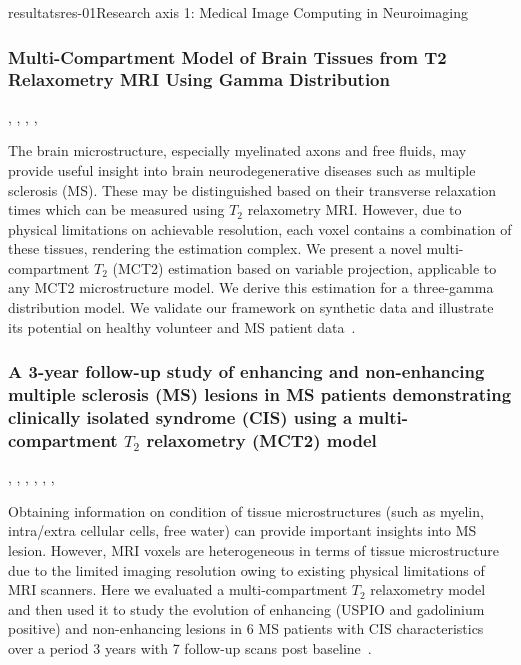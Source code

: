 \documentclass{ra2018}
\begin{document}
\begin{module}{resultats}{res-01}{Research axis 1: Medical Image Computing in Neuroimaging}
\subsubsection{Multi-Compartment Model of Brain Tissues from T2 Relaxometry MRI Using Gamma Distribution}
\begin{participants}
      , 
      ,
      ,
      ,
\end{participants}
The brain microstructure, especially myelinated axons and free fluids, may provide useful insight into brain neurodegenerative diseases such as multiple sclerosis (MS). These may be distinguished based on their transverse relaxation times which can be measured using $T_2$ relaxometry MRI. However, due to physical limitations on achievable resolution, each voxel contains a combination of these tissues, rendering the estimation complex. We present a novel multi-compartment $T_2$ (MCT2) estimation based on variable projection, applicable to any MCT2 microstructure model. We derive this estimation for a three-gamma distribution model. We validate our framework on synthetic data and illustrate its potential on healthy volunteer and MS patient data~\cite{chatterjee:hal-01744852}.

\subsubsection{A 3-year follow-up study of enhancing and non-enhancing multiple sclerosis (MS) lesions in MS patients demonstrating clinically isolated syndrome (CIS) using a multi-compartment $T_2$ relaxometry (MCT2) model}
\begin{participants}
      , 
      ,
      ,
      ,
      ,
      ,
\end{participants}
Obtaining information on condition of tissue microstructures (such as myelin, intra/extra cellular cells, free water) can provide important insights into MS lesion. However, MRI voxels are heterogeneous in terms of tissue microstructure due to the limited imaging resolution owing to existing physical limitations of MRI scanners. Here we evaluated a multi-compartment $T_2$ relaxometry model and then used it to study the evolution of enhancing (USPIO and gadolinium positive) and non-enhancing lesions in 6 MS patients with CIS characteristics over a period 3 years with 7 follow-up scans post baseline~\cite{chatterjee:hal-01821694}.


\end{module}
\end{document}
